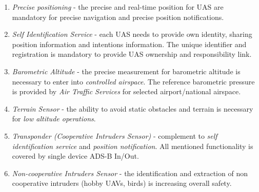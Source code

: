 \begin{enumerate}
    \item \emph{Precise positioning} - the precise and real-time position for UAS are mandatory for precise navigation and precise position notifications. 
    
    \item \emph{Self Identification Service} - each UAS needs to provide own identity, sharing position information and intentions information. The unique identifier and registration is mandatory to provide UAS ownership and responsibility link.
    
    \item \emph{Barometric Altitude} - the precise measurement for barometric altitude is necessary to enter into \emph{controlled airspace}. The reference barometric pressure is provided by \emph{Air Traffic Services} for selected airport/national airspace.
    
    \item \emph{Terrain Sensor} - the ability to avoid static obstacles and terrain is necessary for \emph{low altitude operations}.
    
    \item \emph{Transponder (Cooperative Intruders Sensor)} - complement to \emph{self identification service} and \emph{position notification}. All mentioned functionality is covered by single device ADS-B In/Out.
    
    \item \emph{Non-cooperative Intruders Sensor} - the identification and extraction of non cooperative intruders (hobby UAVs, birds) is increasing overall safety.
\end{enumerate}
